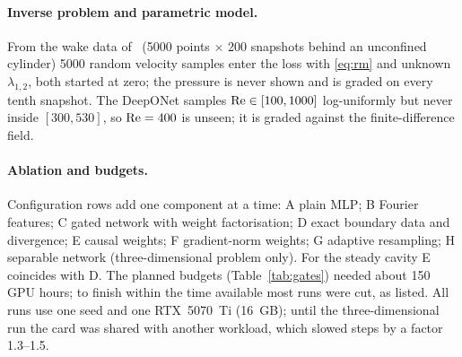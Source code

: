 \paragraph{Inverse problem and parametric model.} From the wake data of~\cite{raissi2019pinn} (5000 points $\times$
200 snapshots behind an unconfined cylinder) 5000 random velocity samples enter the loss with \eqref{eq:rm} and
unknown $\lambda_{1,2}$, both started at zero; the pressure is never shown and is graded on every tenth snapshot.
The DeepONet samples $\mathrm{Re}\in[100,1000]$ log-uniformly but never inside $[300,530]$, so $\mathrm{Re}=400$ is unseen; it is
graded against the finite-difference field.

\paragraph{Ablation and budgets.} Configuration rows add one component at a time: A plain MLP; B Fourier
features; C gated network with weight factorisation; D exact boundary data and divergence; E causal weights; F
gradient-norm weights; G adaptive resampling; H separable network (three-dimensional problem only). For the steady
cavity E coincides with D. The planned budgets (Table~\ref{tab:gates}) needed about 150 GPU hours; to finish within
the time available most runs were cut, as listed. All runs use one seed and one RTX~5070~Ti (16~GB); until the
three-dimensional run the card was shared with another workload, which slowed steps by a factor 1.3--1.5.

